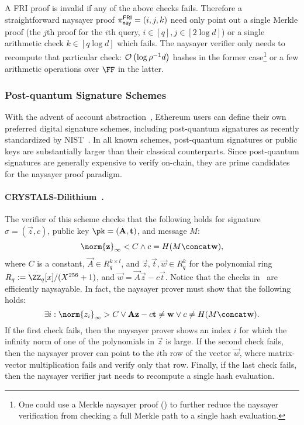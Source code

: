 A FRI proof is invalid if any of the above checks fails. Therefore a straightforward naysayer proof $\pi^{\mathsf{FRI}}_{\mathsf{nay}}=(i,j,k)$ need only point out a single Merkle proof (the $j$th proof for the $i$th query, $i\in[q], j \in [2\log{d}]$) or a single arithmetic check $k \in [q\log{d}]$ which fails. The naysayer verifier only needs to recompute that particular check: $\mathcal{O}\left(\log{\rho^{-1}d}\right)$ hashes in the former case\footnote{One could use a Merkle naysayer proof () to further reduce the naysayer verification from checking a full Merkle path to a single hash evaluation.} or a few arithmetic operations over $\FF$ in the latter.

\subsubsection{Post-quantum Signature Schemes}\label{sec:pqsig_naysayer}

With the advent of account abstraction~\cite{accountabstraction}, Ethereum users can define their own preferred digital signature schemes, including post-quantum signatures as recently standardized by NIST~\cite{CCS:BHKNRS19,TCHES:DKLLS18,NISTPQC:FALCON22}.
In all known schemes, %
post-quantum signatures or public keys are substantially larger than their classical counterparts.  Since post-quantum signatures are generally expensive to verify on-chain, they are prime candidates for the naysayer proof paradigm.

\paragraph{CRYSTALS-Dilithium~\cite{TCHES:DKLLS18}.} The verifier of this scheme checks that the following holds for signature $\sigma=(\vec{z},c)$, public key $\pk=(\vec{A},\vec{t})$, and message $M$:
\begin{equation}\label{eq:crystals_verifier_check}
    \norm{\vec{z}}_\infty < C \land c=H(M \concat \vec{w}),
\end{equation}
where $C$ is a constant, $\vec{A}\in R_q^{k\times l}$, and $\vec{z},\vec{t},\vec{w}\in R_q^k$ for the polynomial ring $R_q:=\ZZ_q[x]/(X^{256}+1)$, and $\vec{w} = \vec{A}\vec{z}-c\vec{t}$. Notice that the checks in~ are efficiently naysayable. In fact, the naysayer prover must show that the following holds: 
\begin{equation}\label{eq:crystals_naysayer_prover}
    \exists i: \norm{z_i}_{\infty}>C 
    \lor \vec{A}\vec{z}-c\vec{t} \neq \vec{w} \lor 
    c\neq H(M \concat \vec{w}).
\end{equation}
If the first check fails, then the naysayer prover shows an index $i$ for which the infinity norm of one of the polynomials in $\vec{z}$ is large. If the second check fails, then the naysayer prover can point to the $i$th row of the vector $\vec{w}$, where matrix-vector multiplication fails and verify only that row. Finally, if the last check fails, then the naysayer verifier just needs to recompute a single hash evaluation.

